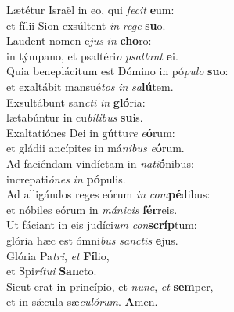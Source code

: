 \evenverse Lætétur Israël in eo, qui \textit{fe}\textit{cit} \textbf{e}um:~\*\\
\evenverse et fílii Sion exsúltent \textit{in} \textit{re}\textit{ge} \textbf{su}o.\\
\oddverse Laudent nomen e\textit{jus} \textit{in} \textbf{cho}ro:~\*\\
\oddverse in týmpano, et psaltéri\textit{o} \textit{psal}\textit{lant} \textbf{e}i.\\
\evenverse Quia beneplácitum est Dómino in pó\textit{pu}\textit{lo} \textbf{su}o:~\*\\
\evenverse et exaltábit mansué\textit{tos} \textit{in} \textit{sa}\textbf{lú}tem.\\
\oddverse Exsultábunt san\textit{cti} \textit{in} \textbf{gló}ria:~\*\\
\oddverse lætabúntur in cu\textit{bí}\textit{li}\textit{bus} \textbf{su}is.\\
\evenverse Exaltatiónes Dei in gúttu\textit{re} \textit{e}\textbf{ó}rum:~\*\\
\evenverse et gládii ancípites in má\textit{ni}\textit{bus} \textit{e}\textbf{ó}rum.\\
\oddverse Ad faciéndam vindíctam in \textit{na}\textit{ti}\textbf{ó}nibus:~\*\\
\oddverse increpati\textit{ó}\textit{nes} \textit{in} \textbf{pó}pulis.\\
\evenverse Ad alligándos reges eórum \textit{in} \textit{com}\textbf{pé}dibus:~\*\\
\evenverse et nóbiles eórum in \textit{má}\textit{ni}\textit{cis} \textbf{fér}reis.\\
\oddverse Ut fáciant in eis judíci\textit{um} \textit{con}\textbf{scríp}tum:~\*\\
\oddverse glória hæc est ómni\textit{bus} \textit{san}\textit{ctis} \textbf{e}jus.\\
\evenverse Glória Pa\textit{tri}, \textit{et} \textbf{Fí}lio,~\*\\
\evenverse et Spi\textit{rí}\textit{tu}\textit{i} \textbf{San}cto.\\
\oddverse Sicut erat in princípio, et \textit{nunc}, \textit{et} \textbf{sem}per,~\*\\
\oddverse et in sǽcula sæ\textit{cu}\textit{ló}\textit{rum}. \textbf{A}men.\\
